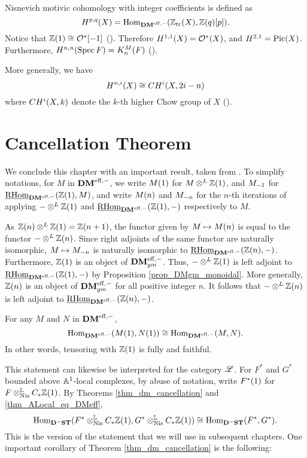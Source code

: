 \begin{rmk}\label{rmk_mot_coh}
Nisnevich motivic cohomology with integer coefficients is defined
as
\[
\MH^{p, q}(X) = \homDMf(\Ztr(X), \Z(q)[p]).
\]
Notice that $\Z(1) \cong \O^*[-1]$ (\cite[4.1]{MVW}).
Therefore $\MH^{1,1}(X) = \O^*(X)$, and $\MH^{2,1} = \Pic(X)$.
Furthermore, $\MH^{n,n}(\Spec F) = \milK_n(F)$ 
(\cite[5.1]{MVW}).

More generally, we have
\[
\MH^{n, i}(X) \cong \CH^i(X, 2i - n)
\]
where $\CH^i(X, k)$ denote the $k$-th higher Chow group of $X$
(\cite[19.1]{MVW}).
\end{rmk}

\section{Cancellation Theorem}
\label{sect_cancellation}

We conclude this chapter with an important result, taken from
\cite[Corollary 4.10]{V02}. To simplify notations, for $M$ in 
$\DMeff$, we write $\tZ{M}$ for $M \tDM \Z(1)$, and $\hZ{M}$ for 
$\ihomDMf(\Z(1), M)$, and write $\tZ[n]{M}$ and $\hZ[n]{M}$ for 
the $n$-th iterations of applying $- \tDM \Z(1)$ and 
$\ihomDMf(\Z(1), -)$ respectively to $M$. 

As $\Z(n) \tDM \Z(1) = \Z(n + 1)$, the functor given by $M \mapsto 
\tZ[n]{M}$ is equal to the functor $- \tDM \Z(n)$. Since right 
adjoints of the same functor are naturally isomorphic, $M \mapsto 
\hZ[n]{M}$ is naturally isomorphic to $\ihomDMf(\Z(n), -)$. 
Furthermore, $\Z(1)$ is an object of $\DMeffgm$. Thus, $- \tDM 
\Z(1)$ is left adjoint to $\ihomDMf(\Z(1), -)$ by Proposition
\ref{prop_DMgm_monoidal}. More generally, $\Z(n)$ is an object
of $\DMeffgm$ for all positive integer $n$. It follows that
$-\tDM \Z(n)$ is left adjoint to $\ihomDMf(\Z(n), -)$.

\begin{thm}[Cancellation]\label{thm_dm_cancellation}
For any $M$ and $N$ in $\DMeff$,
\[
\homDMf(\tZ{M}, \tZ{N}) \cong \homDMf(M, N).
\]
In other words, tensoring with $\Z(1)$ is fully and faithful.
\end{thm}

This statement can likewise be interpreted for the category 
$\ALocal$. For $F^*$ and $G^*$ bounded above $\A^1$-local 
complexes, by abuse of notation, write $\tZ{F^*}$ for
$F \tLNis \suslC \Z(1)$. By Theorems \ref{thm_dm_cancellation}
and \ref{thm_ALocal_eq_DMeff}, 
\[
\hom_{\DShCor}(F^* \tLNis \suslC \Z(1), G^* \tLNis \suslC \Z(1))
\cong \hom_{\DShCor}(F^*, G^*).
\]
This is the version of the statement that we will use in
subsequent chapters. One important corollary of Theorem
\ref{thm_dm_cancellation} is the following:

